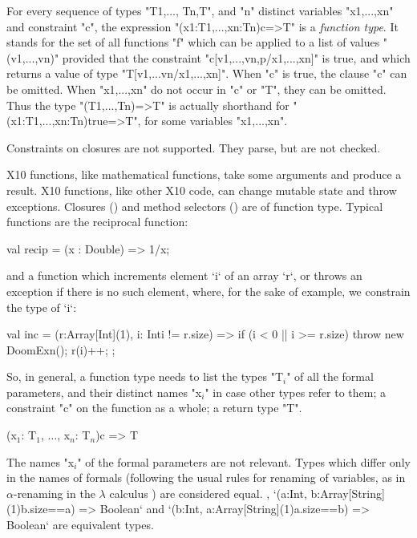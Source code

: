 For every sequence of types \xcd"T1,..., Tn,T", and \xcd"n" distinct variables
\xcd"x1,...,xn" and constraint \xcd"c", the expression
\xcd"(x1:T1,...,xn:Tn){c}=>T" is a \emph{function type}. It stands for
 the set of all functions \xcd"f" which can be applied to a
 list of values \xcd"(v1,...,vn)" provided that the constraint
 \xcd"c[v1,...,vn,p/x1,...,xn]" is true, and which returns a value of
 type \xcd"T[v1,...vn/x1,...,xn]". When \xcd"c" is true, the clause \xcd"{c}" can be
 omitted. When \xcd"x1,...,xn" do not occur in \xcd"c" or \xcd"T", they can be
 omitted. Thus the type \xcd"(T1,...,Tn)=>T" is actually shorthand for
 \xcd"(x1:T1,...,xn:Tn){true}=>T", for some variables \xcd"x1,...,xn".

\limitationx{}
Constraints on closures are not supported.  They parse, but are not checked.


X10 functions, like mathematical functions, take some arguments and produce a
result.  X10 functions, like other X10 code, can change mutable state and
throw exceptions.  Closures () and method
selectors () are of function type.
Typical functions are the reciprocal function: 
\begin{xten}
val recip = (x : Double) => 1/x;
\end{xten}
and a function which increments  element \xcd`i` of an array \xcd`r`, or throws an exception
if there is no such element, where, for the sake of example, we constrain the
type of \xcd`i`:  
\begin{xten}
val inc = (r:Array[Int](1), i: Int{i != r.size}) => {
  if (i < 0 || i >= r.size) throw new DoomExn();
  r(i)++;
};
\end{xten}

So, in general, a function type needs to list the types 
\xcdmath"T$_i$"
of all the formal parameters,
and their distinct names \xcdmath"x$_i$" in case other types refer to them; a
constraint 
\xcd"c" on the
function as a whole; a return type \xcd"T".

\begin{xtenmath}
(x$_1$: T$_1$, $\dots$, x$_n$: T$_n$){c} => T
\end{xtenmath}


The names \xcdmath"x$_i$" of the formal parameters are not relevant.  Types
which differ only in the names of formals (following the usual rules for
renaming of variables, as in {$\alpha$}-renaming in the {$\lambda$} calculus
) are considered equal.  \Eg, 
\xcd`(a:Int, b:Array[String](1){b.size==a}) => Boolean`
and 
\xcd`(b:Int, a:Array[String](1){a.size==b}) => Boolean`
are equivalent types.

